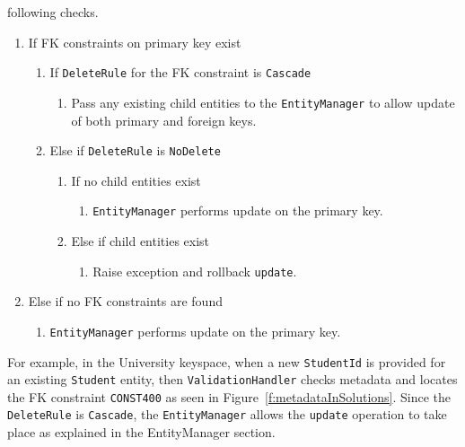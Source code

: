 \begin{description}
\begin{description}
		following checks.
		\renewcommand{\labelenumii}{\arabic{enumi}.\arabic{enumii}}
		\renewcommand{\labelenumiii}{\arabic{enumi}.\arabic{enumii}.\arabic{enumiii}}
		\begin{enumerate}
		  \item If \ac{FK} constraints on primary key exist
		  	\begin{enumerate}		  	
		    \item If \texttt{DeleteRule} for the \ac{FK} constraint is
		    \texttt{Cascade}
		    	\begin{enumerate}
		    	  \item Pass any existing child entities to the \texttt{EntityManager} to
		    	  allow update of both primary and foreign keys.
				\end{enumerate}
			\item Else if \texttt{DeleteRule}  is \texttt{NoDelete}
				\begin{enumerate}
				  \item If no child entities exist
				  		\begin{enumerate}
				  		  \item \texttt{EntityManager} performs update on  the primary key.
				  		\end{enumerate}
				  \item Else if child entities exist
				   		\begin{enumerate}
				    	\item Raise exception and rollback \texttt{update}. 
				    	\end{enumerate}
				\end{enumerate}
			\end{enumerate}
		  \item Else if no \ac{FK} constraints are found 
		  		\begin{enumerate}
		  		  \item \texttt{EntityManager} performs update on the primary key.
				\end{enumerate}
		 \end{enumerate}
		 
		For example,  in the University keyspace,  when a
		new \texttt{StudentId} is provided for an existing  \texttt{Student}
		entity,  then \texttt{ValidationHandler}
		checks metadata and locates the \ac{FK} constraint \texttt{CONST400} as seen in
		Figure~\ref{f:metadataInSolutions}. Since the \texttt{DeleteRule} is
		\texttt{Cascade}, the \texttt{EntityManager} allows the \texttt{update}
		operation to take place as explained in the EntityManager section.
			

\end{description}
\end{description}
